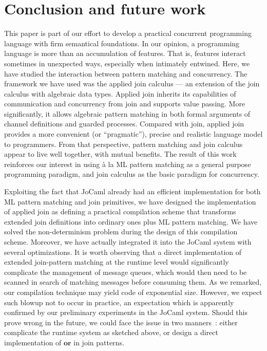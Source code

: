 \documentclass{LMCS}
\newcommand{\jocaml}{\textrm{JoCaml}\xspace}
\newcommand{\kwd}[1]{\ensuremath{\mathbf{#1}}}
\renewcommand{\_}{\mathord{\rule[-.25ex]{1ex}{.15ex}}}
\begin{document}
\section{Conclusion and future work}
\label{sec.conclusion}

This paper is part of our effort to develop a practical concurrent
programming language with firm semantical foundations.
In our opinion, a programming language is more
than an accumulation of features. That is, features interact sometimes
in unexpected ways, especially when intimately entwined.  Here, we
have studied the interaction between pattern matching and concurrency.
The framework we have used was the applied join calculus --- an
extension of the join calculus with algebraic data types. Applied join
inherits its capabilities of communication and concurrency from join
and supports value passing.  More significantly, it allows algebraic
pattern matching in both formal arguments of channel definitions and
guarded processes.  Compared with join, applied join provides a more
convenient (or ``pragmatic''), precise and realistic language model to
programmers.  From that perspective, pattern matching and join
calculus appear to live well together, with mutual benefits. The
result of this work reinforces our interest in using \`{a} la ML
pattern matching as a general purpose programming paradigm, and join
calculus as the basic paradigm for concurrency.

Exploiting the fact that \jocaml already had an efficient
implementation for both ML pattern matching and join primitives, we
have designed the implementation of applied join as defining a
practical compilation scheme that transforms extended join definitions
into ordinary ones plus ML pattern matching. We have solved the
non-determinism problem during the design of this compilation scheme.
Moreover, we have actually integrated it into the \jocaml system with
several optimizations.
It is worth observing that a direct
implementation of extended join-pattern matching at the runtime level
would significantly complicate the management of message queues, which
would then need to be scanned in search of matching messages before
consuming them.
As we remarked, our compilation technique may yield
code of exponential size.
However, we expect such blowup not to occur
in practice, an expectation which is apparently confirmed by
our preliminary experiments in the \jocaml system.
Should this prove wrong in the future, we could
face the issue in two manners~: either complicate the runtime system
as sketched above, or design a direct implementation of \kwd{or} in
join patterns.
\end{document}
